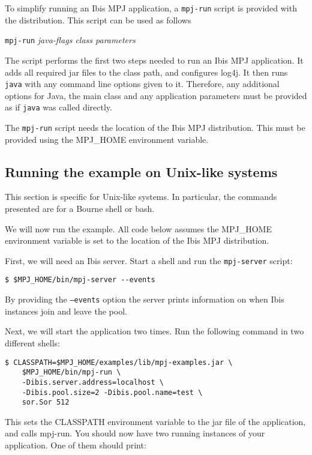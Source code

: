 \documentclass[a4paper,10pt]{article}
\begin{document}
To simplify running an Ibis MPJ application, a \texttt{mpj-run} script is
provided with the distribution. This script can be
used as follows

\begin{center}
\texttt{mpj-run} \emph{java-flags class parameters}
\end{center}

The script performs the first two steps needed to run an Ibis MPJ application.
It adds all required jar files
to the class path, and configures log4j.
It then runs \texttt{java} with any
command line options given to it. Therefore, any additional options for
Java, the main class and any application parameters must be provided as
if \texttt{java} was called directly.

The \texttt{mpj-run} script needs the location of the Ibis MPJ
distribution. This must be provided using the MPJ\_HOME environment
variable.

\subsection{Running the example on Unix-like systems}

This section is specific for Unix-like systems. In particular, the
commands presented are for a Bourne shell or bash.

We will now run the example. All code below assumes the MPJ\_HOME
environment variable is set to the location of the Ibis MPJ distribution.

First, we will need an Ibis server. Start a shell and
run the \texttt{mpj-server} script:
\noindent
{\small
\begin{verbatim}
$ $MPJ_HOME/bin/mpj-server --events
\end{verbatim}
}
\noindent

By providing the \texttt{--events} option the server
prints information on when Ibis instances join and leave the pool.

Next, we will start the application two times.
Run the following command in two different shells:

\noindent
{\small
\begin{verbatim}
$ CLASSPATH=$MPJ_HOME/examples/lib/mpj-examples.jar \
    $MPJ_HOME/bin/mpj-run \
    -Dibis.server.address=localhost \
    -Dibis.pool.size=2 -Dibis.pool.name=test \
    sor.Sor 512
\end{verbatim}
}
\noindent

This sets the CLASSPATH environment variable to the jar file of the
application, and calls mpj-run. You should now have two running
instances of your application. One of them should print:
\end{document}
